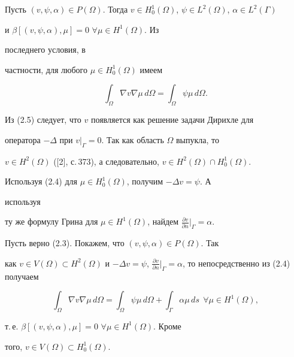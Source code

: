 Пусть $(v,\psi,\alpha)\in P(\Omega)$. Тогда $v\in H^1_0(\Omega)$, $\psi\in 


L^2(\Omega)$, $\alpha\in L^2(\Gamma)$ 


и $\beta[(v,\psi,\alpha),\mu]=0$ \; $\forall\mu\in H^1(\Omega)$. Из 


последнего условия, в 


частности, для любого $\mu\in H^1_0(\Omega)$ имеем 


\begin{equation} 


\int_\Omega \nabla v\nabla \mu\,d\Omega=\int_\Omega 


\psi\mu\,d\Omega. 


\end{equation} 


Из (2.5) следует, что $v$ появляется как решение задачи Дирихле для 


оператора $-\Delta$ при $v|_\Gamma=0$. Так как область $\Omega$ выпукла, то 


$v\in H^2(\Omega)$ ([2], с.\,373), а следовательно, $v\in H^2(\Omega)\cap 


H^1_0(\Omega)$. 


Используя (2.4) для $\mu\in H^1_0(\Omega)$, получим $-\Delta v=\psi$. А 


используя 


ту же формулу Грина для $\mu\in H^1(\Omega)$, найдем $\frac{\partial 


v}{\partial n}\big|_\Gamma=\alpha$. 


 


Пусть верно (2.3). Покажем, что $(v,\psi,\alpha)\in P(\Omega)$. Так 


как $v\in V(\Omega)\subset H^2(\Omega)$ и $-\Delta v=\psi$, $\frac{\partial 


v}{\partial n}\big|_\Gamma=\alpha$, то непосредственно из (2.4) получаем 


$$ 


\int_\Omega \nabla v\nabla\mu\,d\Omega=\int_\Omega\psi\mu\,d\Omega+ 


\int_\Gamma\alpha\mu\,ds\ \ \forall\mu\in H^1(\Omega), 


$$ 


т.\,е. $\beta[(v,\psi,\alpha),\mu]=0$ \; $\forall\mu\in H^1(\Omega)$. Кроме 


того, $v\in V(\Omega)\subset H^1_0(\Omega)$. 


 


